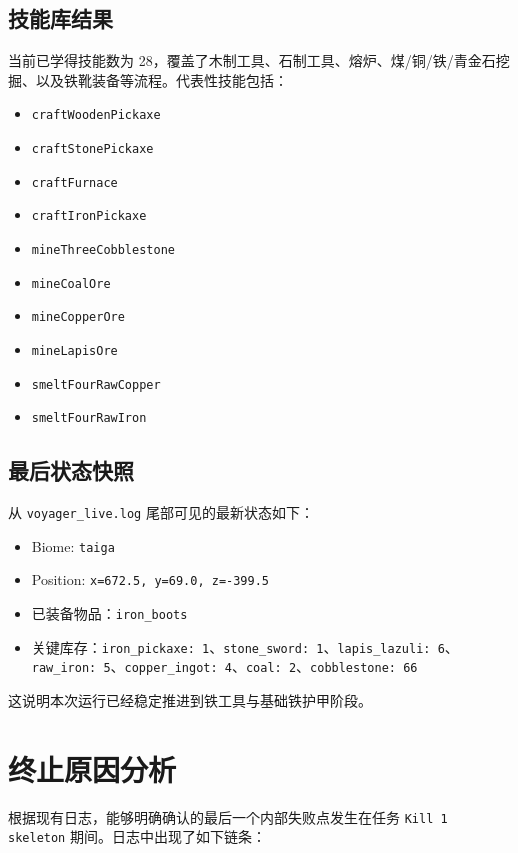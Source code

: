 \documentclass[11pt,a4paper]{ctexart}
\begin{document}
\subsection{技能库结果}

当前已学得技能数为 28，覆盖了木制工具、石制工具、熔炉、煤/铜/铁/青金石挖掘、以及铁靴装备等流程。代表性技能包括：

\begin{itemize}
  \item \texttt{craftWoodenPickaxe}
  \item \texttt{craftStonePickaxe}
  \item \texttt{craftFurnace}
  \item \texttt{craftIronPickaxe}
  \item \texttt{mineThreeCobblestone}
  \item \texttt{mineCoalOre}
  \item \texttt{mineCopperOre}
  \item \texttt{mineLapisOre}
  \item \texttt{smeltFourRawCopper}
  \item \texttt{smeltFourRawIron}
\end{itemize}

\subsection{最后状态快照}

从 \texttt{voyager\_live.log} 尾部可见的最新状态如下：

\begin{itemize}
  \item Biome: \texttt{taiga}
  \item Position: \texttt{x=672.5, y=69.0, z=-399.5}
  \item 已装备物品：\texttt{iron\_boots}
  \item 关键库存：\texttt{iron\_pickaxe: 1}、\texttt{stone\_sword: 1}、\texttt{lapis\_lazuli: 6}、\texttt{raw\_iron: 5}、\texttt{copper\_ingot: 4}、\texttt{coal: 2}、\texttt{cobblestone: 66}
\end{itemize}

这说明本次运行已经稳定推进到铁工具与基础铁护甲阶段。

\section{终止原因分析}

根据现有日志，能够明确确认的最后一个内部失败点发生在任务 \texttt{Kill 1 skeleton} 期间。日志中出现了如下链条：
\end{document}
